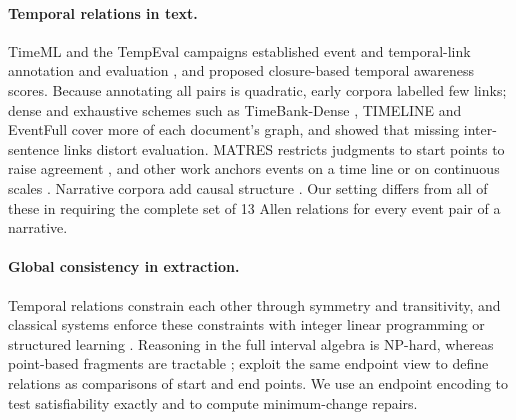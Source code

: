 \documentclass[11pt]{article}
\begin{document}
\paragraph{Temporal relations in text.}
TimeML and the TempEval campaigns established event and temporal-link annotation and evaluation \citep{pustejovsky2003timeml,uzzaman2012tempeval}, and \citet{uzzaman-allen-2011-temporal} proposed closure-based temporal awareness scores. Because annotating all pairs is quadratic, early corpora labelled few links; dense and exhaustive schemes such as TimeBank-Dense \citep{cassidy-etal-2014-annotation}, TIMELINE \citep{alsayyahi-batista-navarro-2023-timeline} and EventFull \citep{eirew-etal-2025-eventfull} cover more of each document's graph, and \citet{dsouza-ng-2014-annotating} showed that missing inter-sentence links distort evaluation. MATRES restricts judgments to start points to raise agreement \citep{ning2018multi}, and other work anchors events on a time line or on continuous scales \citep{reimers-etal-2016-temporal,vashishtha-etal-2019-fine}. Narrative corpora add causal structure \citep{mostafazadeh-etal-2016-caters,caselli-vossen-2017-event}. Our setting differs from all of these in requiring the complete set of 13 Allen relations for every event pair of a narrative.

\paragraph{Global consistency in extraction.}
Temporal relations constrain each other through symmetry and transitivity, and classical systems enforce these constraints with integer linear programming or structured learning \citep{do-etal-2012-joint,chambers-etal-2014-dense,ning-etal-2017-structured,ning-etal-2018-joint,han-etal-2019-joint,han-etal-2019-deep}. Reasoning in the full interval algebra is NP-hard, whereas point-based fragments are tractable \citep{vilain1990constraint,nebel1995reasoning}; \citet{huang-etal-2023-classification} exploit the same endpoint view to define relations as comparisons of start and end points. We use an endpoint encoding to test satisfiability exactly and to compute minimum-change repairs.
\end{document}
